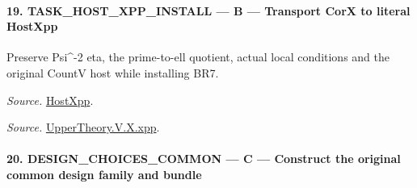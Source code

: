 \paragraph{19. TASK\_\allowbreak HOST\_\allowbreak XPP\_\allowbreak INSTALL — B — Transport CorX to literal HostXpp}

Preserve Psi\textasciicircum{}-2 eta, the prime-to-ell quotient, actual local conditions and the original CountV host while installing BR7.

\emph{Source.} \href{https://github.com/CocoSgt/riemann-hypothesis-lean/blob/7cbf7a0c32fca1badf05931879a37c3f8a2b03b4/src/Development/AutomorphicArithmetic/AutomorphicVarieties/UnitaryThreeDeformations/HostNumber.lean#L14-L17}{HostXpp}.

\emph{Source.} \href{https://github.com/CocoSgt/riemann-hypothesis-lean/blob/7cbf7a0c32fca1badf05931879a37c3f8a2b03b4/src/Development/AutomorphicArithmetic/AutomorphicVarieties/LevelCohomology/Xpp.lean#L11-L84}{UpperTheory.V.X.xpp}.



\paragraph{20. DESIGN\_\allowbreak CHOICES\_\allowbreak COMMON — C — Construct the original common design family and bundle}

